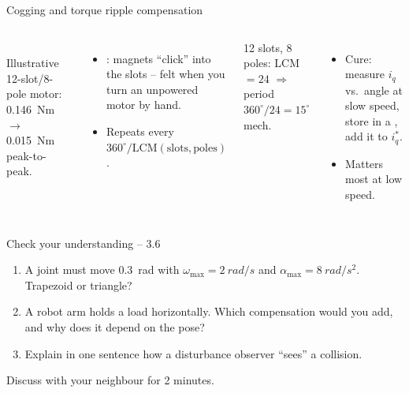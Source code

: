 \documentclass[aspectratio=169,10pt]{beamer}
\begin{document}
\begin{frame}[t]{Cogging and torque ripple compensation}
\begin{columns}[T,onlytextwidth]
\\
\scriptsize Illustrative 12-slot/8-pole motor: \SI{0.146}{Nm} $\to$ \SI{0.015}{Nm} peak-to-peak.
\begin{itemize}\small
\item {}: magnets ``click'' into the slots -- felt when you turn an unpowered motor by hand.
\item Repeats every $360^\circ/\text{LCM}(\text{slots},\text{poles})$.
\end{itemize}
\begin{defbox}[Example]
\small 12 slots, 8 poles: LCM $=24$ $\Rightarrow$ period $360^\circ/24=15^\circ$ mech.
\end{defbox}
\begin{itemize}\small
\item Cure: measure $i_q$ vs.\ angle at slow speed, store in a , add it to $i_q^*$.
\item Matters most at low speed.
\end{itemize}
\end{columns}
\end{frame}

\begin{frame}[t]{Check your understanding -- 3.6}
\vspace{4mm}
\begin{keybox}
\large
\begin{enumerate}
\item A joint must move \SI{0.3}{rad} with $\omega_\text{max}=\SI{2}{rad/s}$ and $\alpha_\text{max}=\SI{8}{rad/s^2}$. Trapezoid or triangle?\\[3mm]
\item A robot arm holds a load horizontally. Which compensation would you add, and why does it depend on the pose?\\[3mm]
\item Explain in one sentence how a disturbance observer ``sees'' a collision.
\end{enumerate}
\end{keybox}
\vfill
\centering\small\color{mkGray} Discuss with your neighbour for 2 minutes.
\end{frame}
\end{document}
